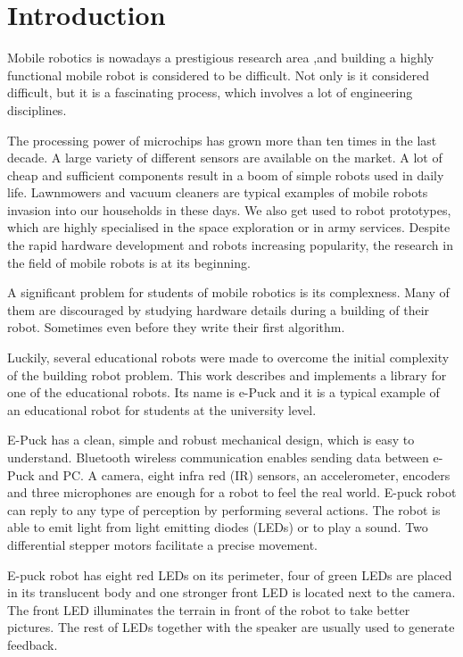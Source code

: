 \chapter{Introduction}
\label{chap:intro}
	Mobile robotics is nowadays a prestigious research area ,and building a highly functional 
	mobile robot is considered to be difficult. 
	Not only is it considered difficult, but it is a fascinating process, which
	involves a lot of engineering disciplines.
	
	The processing power of microchips has grown more than ten times in the last decade. 
	A large variety of different sensors are available on the market.	
	A lot of cheap and sufficient components result in a boom of simple robots used in daily life. 
	Lawnmowers and vacuum cleaners are typical examples of mobile robots invasion into our households in these days.
	We also get used to robot prototypes, which are highly specialised in the space exploration or in army services.
	Despite the rapid hardware development and robots increasing popularity,
	the research in the field of mobile robots is at its beginning. 
	
	A significant problem for students of mobile robotics is its complexness. Many of them are discouraged by
	studying hardware  details during a building of their robot. 
	Sometimes even before they write  their first algorithm.

	Luckily, several educational robots were made to overcome the initial complexity of the building robot problem.	
	This work describes and implements a library for one of the educational robots.
	Its name is e-Puck and it is a typical example of an educational robot for students at the university level. 
	
	E-Puck has a clean, simple and robust mechanical design, which is easy to understand.
	Bluetooth wireless communication enables sending data between e-Puck and PC.
	A camera, eight infra red (IR) sensors,	an accelerometer, encoders and three microphones 
	are enough for a robot to feel the real world.
	E-puck robot can reply to any type of perception by performing several actions. 
	The robot is able to emit light from light emitting diodes (LEDs) or to play a sound.
	Two differential stepper motors facilitate a precise movement. 
	
	E-puck robot has eight red LEDs on its perimeter, four of green LEDs are placed in its translucent body and
	one stronger front LED is located next to the camera. 
	The front LED illuminates the terrain in front of the robot to
	take better pictures. The rest of LEDs together with the speaker are usually used to
	generate feedback. 
	
